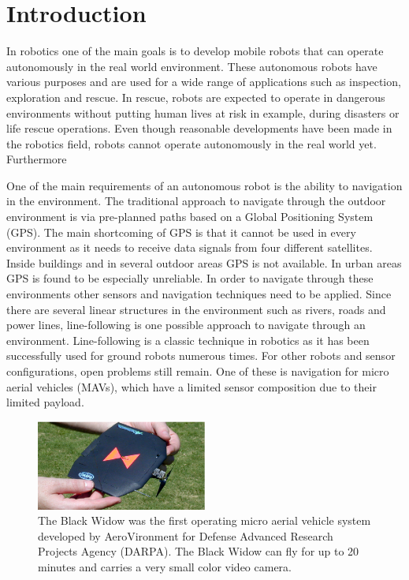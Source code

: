 \documentclass[a4paper]{article}
\begin{document}
\thispagestyle{empty}
\tableofcontents
\newpage
\setcounter{page}{1}
\onehalfspace

\section{Introduction}
In robotics one of the main goals is to develop mobile robots that can operate autonomously in the real world environment. These autonomous robots have various purposes and are used for a wide range of applications such as inspection, exploration and rescue. In rescue, robots are expected to operate in dangerous environments without putting human lives at risk in example, during disasters or life rescue operations. Even though reasonable developments have been made in the robotics field, robots cannot operate autonomously in the real world yet. Furthermore

One of the main requirements of an autonomous robot is the ability to navigation in the environment. The traditional approach to navigate through the outdoor environment is via pre-planned paths based on a Global Positioning System (GPS). The main shortcoming of GPS is that it cannot be used in every environment as it needs to receive data signals from four different satellites. Inside buildings and in several outdoor areas GPS is not available. In urban areas GPS is found to be especially unreliable. In order to navigate through these environments other sensors and navigation techniques need to be applied. Since there are several linear structures in the environment such as rivers, roads and power lines, line-following is one possible approach to navigate through an environment. Line-following is a classic technique in robotics as it has been successfully used for ground robots numerous times. For other robots and sensor configurations, open problems still remain. One of these is navigation for micro aerial vehicles (MAVs), which have a limited sensor composition due to their limited payload.

\begin{figure}[!h]
	\centering
	\includegraphics[width=0.5\textwidth]{images/blackwidow.eps}
	\caption{The Black Widow \cite{Grasmeyer2001} was the first operating micro aerial vehicle system developed by AeroVironment for Defense Advanced Research Projects Agency (DARPA). The Black Widow can fly for up to 20 minutes and carries a very small color video camera.}
	\label{blackwidow}
\end{figure}
\end{document}
